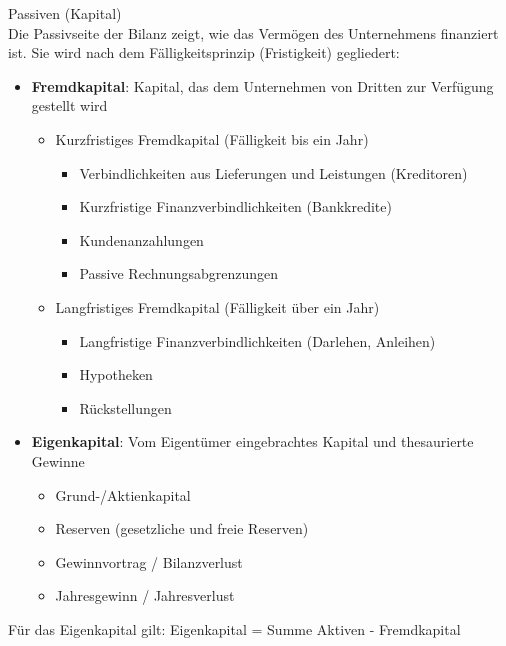 \begin{definition}{Passiven (Kapital)}\\
Die Passivseite der Bilanz zeigt, wie das Vermögen des Unternehmens finanziert ist. Sie wird nach dem Fälligkeitsprinzip (Fristigkeit) gegliedert:
\begin{itemize}
    \item \textbf{Fremdkapital}: Kapital, das dem Unternehmen von Dritten zur Verfügung gestellt wird
    \begin{itemize}
        \item Kurzfristiges Fremdkapital (Fälligkeit bis ein Jahr)
        \begin{itemize}
            \item Verbindlichkeiten aus Lieferungen und Leistungen (Kreditoren)
            \item Kurzfristige Finanzverbindlichkeiten (Bankkredite)
            \item Kundenanzahlungen
            \item Passive Rechnungsabgrenzungen
        \end{itemize}
        \item Langfristiges Fremdkapital (Fälligkeit über ein Jahr)
        \begin{itemize}
            \item Langfristige Finanzverbindlichkeiten (Darlehen, Anleihen)
            \item Hypotheken
            \item Rückstellungen
        \end{itemize}
    \end{itemize}
    \item \textbf{Eigenkapital}: Vom Eigentümer eingebrachtes Kapital und thesaurierte Gewinne
    \begin{itemize}
        \item Grund-/Aktienkapital
        \item Reserven (gesetzliche und freie Reserven)
        \item Gewinnvortrag / Bilanzverlust
        \item Jahresgewinn / Jahresverlust
    \end{itemize}
\end{itemize}

Für das Eigenkapital gilt: Eigenkapital = Summe Aktiven - Fremdkapital
\end{definition}

